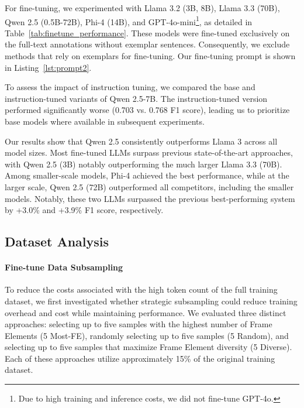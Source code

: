 

For fine-tuning, we experimented with Llama 3.2 (3B, 8B), Llama 3.3 (70B), Qwen 2.5 (0.5B-72B), Phi-4 (14B), and GPT-4o-mini\footnote{Due to high training and inference costs, we did not fine-tune GPT-4o.}, as detailed in Table~\ref{tab:finetune_performance}. These models were fine-tuned exclusively on the full-text annotations without exemplar sentences. Consequently, we exclude methods that rely on exemplars for fine-tuning. Our fine-tuning prompt is shown in Listing~\ref{lst:prompt2}.

To assess the impact of instruction tuning, we compared the base and instruction-tuned variants of Qwen 2.5-7B. The instruction-tuned version performed significantly worse (0.703 vs. 0.768 F1 score), leading us to prioritize base models where available in subsequent experiments.

Our results show that Qwen 2.5 consistently outperforms Llama 3 across all model sizes. Most fine-tuned LLMs surpass previous state-of-the-art approaches, with Qwen 2.5 (3B) notably outperforming the much larger Llama 3.3 (70B). Among smaller-scale models, Phi-4 achieved the best performance, while at the larger scale, Qwen 2.5 (72B) outperformed all competitors, including the smaller models. Notably, these two LLMs surpassed the previous best-performing system~\citet{Ai_Tu_2024} by +3.0\% and +3.9\% F1 score, respectively.


\subsection{Dataset Analysis}

\paragraph{Fine-tune Data Subsampling}
To reduce the costs associated with the high token count of the full training dataset, we first investigated whether strategic subsampling could reduce training overhead and cost while maintaining performance. We evaluated three distinct approaches: selecting up to five samples with the highest number of Frame Elements (5 Most-FE), randomly selecting up to five samples (5 Random), and selecting up to five samples that maximize Frame Element diversity (5 Diverse). Each of these approaches utilize approximately 15\% of the original training dataset. 

